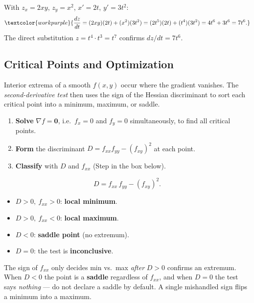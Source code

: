 \begin{examplebox}[Worked Example 6.4: Chain rule for $z=x^2y$, $x=t^2$, $y=t^3$]
With $z_x=2xy$, $z_y=x^2$, $x'=2t$, $y'=3t^2$:
\[ \textcolor{workpurple}{\frac{dz}{dt} = (2xy)(2t) + (x^2)(3t^2)
   = (2t^5)(2t) + (t^4)(3t^2) = 4t^6 + 3t^6 = 7t^6.} \]
The direct substitution $z=t^4\cdot t^3=t^7$ confirms $dz/dt=7t^6$.
\end{examplebox}

\subsection{Critical Points and Optimization}

Interior extrema of a smooth $f(x,y)$ occur where the gradient vanishes. The
\emph{second-derivative test} then uses the sign of the Hessian discriminant to
sort each critical point into a minimum, maximum, or saddle.

\begin{methodbox}
\begin{enumerate}[leftmargin=1.6em, itemsep=2pt]
    \item \textbf{Solve} $\nabla f=\mathbf 0$, i.e.\ $f_x=0$ and $f_y=0$
          simultaneously, to find all critical points.
    \item \textbf{Form} the discriminant
          $D = f_{xx}f_{yy} - \left(f_{xy}\right)^2$ at each point.
    \item \textbf{Classify} with $D$ and $f_{xx}$ (Step in the box below).
\end{enumerate}
\end{methodbox}

\begin{formulabox}
\[ D = f_{xx}\,f_{yy} - \left(f_{xy}\right)^2. \]
\begin{itemize}[leftmargin=1.4em, itemsep=2pt]
    \item $D>0,\ f_{xx}>0$: \textbf{local minimum}.
    \item $D>0,\ f_{xx}<0$: \textbf{local maximum}.
    \item $D<0$: \textbf{saddle point} (no extremum).
    \item $D=0$: the test is \textbf{inconclusive}.
\end{itemize}
\end{formulabox}

\begin{warningbox}
The sign of $f_{xx}$ only decides min vs.\ max \emph{after} $D>0$ confirms an
extremum. When $D<0$ the point is a \textbf{saddle} regardless of $f_{xx}$, and
when $D=0$ the test says \emph{nothing} --- do not declare a saddle by default.
A single mishandled sign flips a minimum into a maximum.
\end{warningbox}

